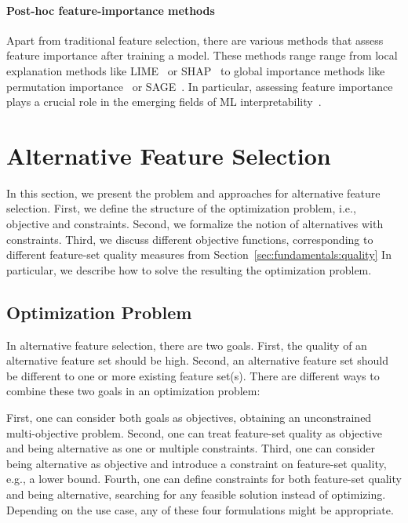 \documentclass{article}
\theoremstyle{definition}
\begin{document}
\paragraph{Post-hoc feature-importance methods}

Apart from traditional feature selection, there are various methods that assess feature importance after training a model.
These methods range range from local explanation methods like LIME~\cite{ribeiro2016should} or SHAP~\cite{lundberg2017unified} to global importance methods like permutation importance~\cite{breiman2001random} or SAGE~\cite{covert2020understanding}.
In particular, assessing feature importance plays a crucial role in the emerging fields of ML interpretability~\cite{carvalho2019machine}.

\section{Alternative Feature Selection}
\label{sec:approach}

In this section, we present the problem and approaches for alternative feature selection.
First, we define the structure of the optimization problem, i.e., objective and constraints.
Second, we formalize the notion of alternatives with constraints.
Third, we discuss different objective functions, corresponding to different feature-set quality measures from Section~\ref{sec:fundamentals:quality}
In particular, we describe how to solve the resulting the optimization problem.

\subsection{Optimization Problem}
\label{sec:approach:problem}

In alternative feature selection, there are two goals.
First, the quality of an alternative feature set should be high.
Second, an alternative feature set should be different to one or more existing feature set(s).
There are different ways to combine these two goals in an optimization problem:

First, one can consider both goals as objectives, obtaining an unconstrained multi-objective problem.
Second, one can treat feature-set quality as objective and being alternative as one or multiple constraints.
Third, one can consider being alternative as objective and introduce a constraint on feature-set quality, e.g., a lower bound.
Fourth, one can define constraints for both feature-set quality and being alternative, searching for any feasible solution instead of optimizing.
Depending on the use case, any of these four formulations might be appropriate.
\end{document}
